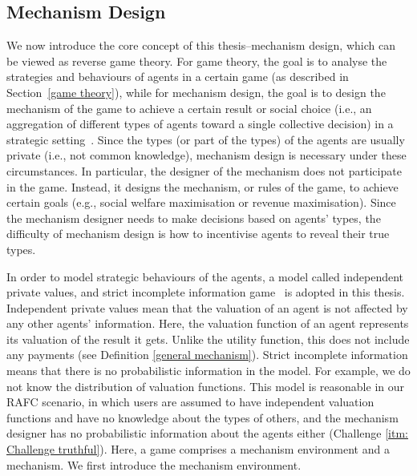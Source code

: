 \documentclass[11pt]{phdthesis}
\begin{document}

\subsection{Mechanism Design} \label{mechanism design}

We now introduce the core concept of this thesis–mechanism design, which can be viewed as reverse game theory. For game theory, the goal is to analyse the strategies and behaviours of agents in a certain game (as described in Section~\ref{game theory}), while for mechanism design, the goal is to design the mechanism of the game to achieve a certain result or social choice (i.e., an aggregation of different types of agents toward a single collective decision) in a strategic setting~\citep{nisan2007algorithmic}. Since the types (or part of the types) of the agents are usually private (i.e., not common knowledge), mechanism design is necessary under these circumstances. In particular, the designer of the mechanism does not participate in the game. Instead, it designs the mechanism, or rules of the game, to achieve certain goals (e.g., social welfare maximisation or revenue maximisation). Since the mechanism designer needs to make decisions based on agents' types, the difficulty of mechanism design is how to incentivise agents to reveal their true types. 

In order to model strategic behaviours of the agents, a model called independent private values, and strict incomplete information game~\citep[Chapter 9]{nisan2007algorithmic} is adopted in this thesis. Independent private values mean that the valuation of an agent is not affected by any other agents' information. Here, the valuation function of an agent represents its valuation of the result it gets. Unlike the utility function, this does not include any payments (see Definition \ref{general mechanism}). 
Strict incomplete information means that there is no probabilistic information in the model. For example, we do not know the distribution of valuation functions. This model is reasonable in our RAFC scenario, in which users are assumed to have independent valuation functions and have no knowledge about the types of others, and the mechanism designer has no probabilistic information about the agents either (Challenge \ref{itm: Challenge truthful}). Here, a game comprises a mechanism environment and a mechanism. We first introduce the mechanism environment.
\end{document}
